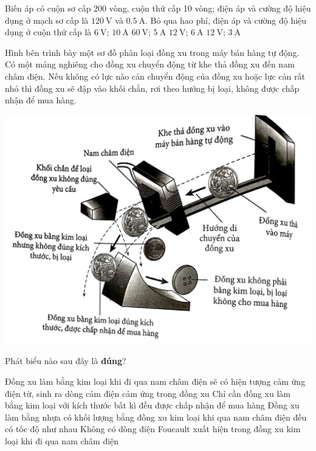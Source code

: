 \begin{ex}
	Biến áp có cuộn sơ cấp 200 vòng, cuộn thứ cấp 10 vòng; điện áp và cường độ hiệu dụng ở mạch sơ cấp là $\SI{120}{\volt}$ và $\SI{0.5}{\ampere}$. Bỏ qua hao phí, điện áp và cường độ hiệu dụng ở cuộn thứ cấp là
	\choice
	{\True $\SI{6}{\volt}$; $\SI{10}{\ampere}$}
	{$\SI{60}{\volt}$; $\SI{5}{\ampere}$}
	{$\SI{12}{\volt}$; $\SI{6}{\ampere}$}
	{$\SI{12}{\volt}$; $\SI{3}{\ampere}$}
\end{ex}

\begin{ex}
Hình bên trình bày một sơ đồ phân loại đồng xu trong máy bán hàng tự động. Có một máng nghiêng cho đồng xu chuyển động từ khe thả đồng xu đến nam châm điện. Nếu không có lực nào cản chuyển động của đồng xu hoặc lực cản rất nhỏ thì đồng xu sẽ đập vào khối chắn, rơi theo hướng bị loại, không được chấp nhận để mua hàng.
\begin{center}
	\includegraphics[scale=0.35]{figs/VN12-Y24-PH-SYL-024P-1}
\end{center}
		Phát biểu nào sau đây là \textbf{đúng}?

	\choice
	{\True Đồng xu làm bằng kim loại khi đi qua nam châm điện sẽ có hiện tượng cảm ứng điện từ, sinh ra dòng cảm điện cảm ứng trong đồng xu}
	{Chỉ cần đồng xu làm bằng kim loại với kích thước bất kì đều được chấp nhận để mua hàng}
	{Đồng xu làm bằng nhựa có khối lượng bằng đồng xu kim loại khi qua nam châm điện đều có tốc độ như nhau}
	{Không có dòng điện Foucault xuất hiện trong đồng xu kim loại khi đi qua nam châm điện}
	\loigiai{}
\end{ex}
